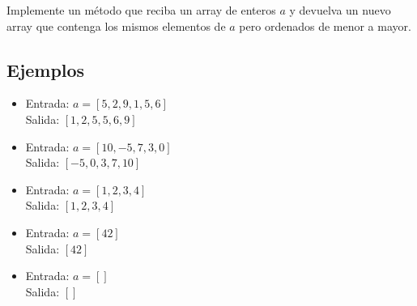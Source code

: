 Implemente un método que reciba un array de enteros \(a\) y devuelva un nuevo array que contenga los mismos elementos de \(a\) pero ordenados de menor a mayor.

\subsection*{Ejemplos}

\begin{itemize}
    \item Entrada: \(a = [5, 2, 9, 1, 5, 6]\)\\
    Salida: \([1, 2, 5, 5, 6, 9]\)\\

    \item Entrada: \(a = [10, -5, 7, 3, 0]\)\\
    Salida: \([-5, 0, 3, 7, 10]\)\\

    \item Entrada: \(a = [1, 2, 3, 4]\)\\
    Salida: \([1, 2, 3, 4]\)\\

    \item Entrada: \(a = [42]\)\\
    Salida: \([42]\)\\

    \item Entrada: \(a = []\)\\
    Salida: \([]\)\\
\end{itemize}
